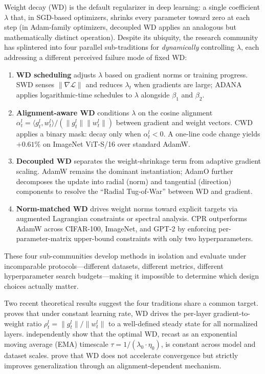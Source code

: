 \documentclass{article}
\begin{document}
Weight decay (WD) is the default regularizer in deep learning: a single coefficient $\lambda$ that, in SGD-based optimizers, shrinks every parameter toward zero at each step (in Adam-family optimizers, decoupled WD applies an analogous but mathematically distinct operation). Despite its ubiquity, the research community has splintered into four parallel sub-traditions for \emph{dynamically} controlling $\lambda$, each addressing a different perceived failure mode of fixed WD:

\begin{enumerate}
\item \textbf{WD scheduling} adjusts $\lambda$ based on gradient norms or training progress. SWD \citep{xie2023swd} senses $\|\nabla \mathcal{L}\|$ and reduces $\lambda_t$ when gradients are large; ADANA \citep{ferbach2026adana} applies logarithmic-time schedules to $\lambda$ alongside $\beta_1$ and $\beta_2$.

\item \textbf{Alignment-aware WD} conditions $\lambda$ on the cosine alignment $\alpha_t^l = \langle g_t^l, w_t^l \rangle / (\|g_t^l\| \|w_t^l\|)$ between gradient and weight vectors. CWD \citep{chen2026cwd} applies a binary mask: decay only when $\alpha_t^l < 0$. A one-line code change yields $+0.61\%$ on ImageNet ViT-S/16 over standard AdamW.

\item \textbf{Decoupled WD} separates the weight-shrinkage term from adaptive gradient scaling. AdamW \citep{loshchilov2019adamw} remains the dominant instantiation; AdamO \citep{chen2026adamo} further decomposes the update into radial (norm) and tangential (direction) components to resolve the ``Radial Tug-of-War'' between WD and gradient.

\item \textbf{Norm-matched WD} drives weight norms toward explicit targets via augmented Lagrangian constraints or spectral analysis. CPR \citep{franke2024cpr} outperforms AdamW across CIFAR-100, ImageNet, and GPT-2 by enforcing per-parameter-matrix upper-bound constraints with only two hyperparameters.
\end{enumerate}

These four sub-communities develop methods in isolation and evaluate under incomparable protocols---different datasets, different metrics, different hyperparameter search budgets---making it impossible to determine which design choices actually matter.

Two recent theoretical results suggest the four traditions share a common target. \citet{defazio2025gw} proves that under constant learning rate, WD drives the per-layer gradient-to-weight ratio $\rho_t^l = \|g_t^l\| / \|w_t^l\|$ to a well-defined steady state for all normalized layers. \citet{wang2025ema} independently show that the optimal WD, recast as an exponential moving average (EMA) timescale $\tau = 1/(\lambda_0 \cdot \eta_0)$, is constant across model and dataset scales. \citet{sun2025wd} prove that WD does not accelerate convergence but strictly improves generalization through an alignment-dependent mechanism.
\end{document}
